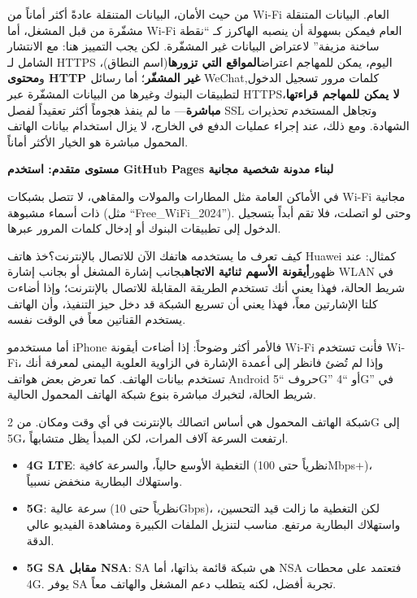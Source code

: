 
من حيث الأمان، البيانات المتنقلة عادةً أكثر أماناً من Wi-Fi العام. البيانات المتنقلة مشفّرة من قبل المشغل، أما Wi-Fi العام فيمكن بسهولة أن ينصبه الهاكرز كـ “نقطة ساخنة مزيفة” لاعتراض البيانات غير المشفّرة. لكن يجب التمييز هنا: مع الانتشار الشامل لـ HTTPS اليوم، يمكن للمهاجم اعتراض\textbf{المواقع التي تزورها}(اسم النطاق)، و\textbf{محتوى HTTP غير المشفّر}؛ أما رسائل WeChat,كلمات مرور تسجيل الدخول لتطبيقات البنوك وغيرها من البيانات المشفّرة عبر HTTPS،\textbf{لا يمكن للمهاجم قراءتها مباشرة}— ما لم ينفذ هجوماً أكثر تعقيداً لفصل SSL وتجاهل المستخدم تحذيرات الشهادة. ومع ذلك، عند إجراء عمليات الدفع في الخارج، لا يزال استخدام بيانات الهاتف المحمول مباشرة هو الخيار الأكثر أماناً.

\textbf{مستوى متقدم: استخدم GitHub Pages لبناء مدونة شخصية مجانية}\par

في الأماكن العامة مثل المطارات والمولات والمقاهي، لا تتصل بشبكات Wi-Fi مجانية ذات أسماء مشبوهة (مثل “Free\_WiFi\_2024”). وحتى لو اتصلت، فلا تقم أبداً بتسجيل الدخول إلى تطبيقات البنوك أو إدخال كلمات المرور عبرها.


كيف تعرف ما يستخدمه هاتفك الآن للاتصال بالإنترنت؟خذ هاتف Huawei كمثال: عند ظهور\textbf{أيقونة الأسهم ثنائية الاتجاه}بجانب إشارة المشغل أو بجانب إشارة WLAN في شريط الحالة، فهذا يعني أنك تستخدم الطريقة المقابلة للاتصال بالإنترنت؛ وإذا أضاءت كلتا الإشارتين معاً، فهذا يعني أن تسريع الشبكة قد دخل حيز التنفيذ، وأن الهاتف يستخدم القناتين معاً في الوقت نفسه.

أما مستخدمو iPhone فالأمر أكثر وضوحاً: إذا أضاءت أيقونة Wi-Fi فأنت تستخدم Wi-Fi، وإذا لم تُضئ فانظر إلى أعمدة الإشارة في الزاوية العلوية اليمنى لمعرفة أنك تستخدم بيانات الهاتف. كما تعرض بعض هواتف Android حروف “5G” أو “4G” في شريط الحالة، لتخبرك مباشرة بنوع شبكة الهاتف المحمول الحالية.


شبكة الهاتف المحمول هي أساس اتصالك بالإنترنت في أي وقت ومكان. من 2G إلى 5G، ارتفعت السرعة آلاف المرات، لكن المبدأ يظل متشابهاً.


\begin{itemize}
  \item \textbf{4G LTE}: التغطية الأوسع حالياً، والسرعة كافية (نظرياً حتى 100Mbps+)، واستهلاك البطارية منخفض نسبياً.
  \item \textbf{5G}: سرعة عالية (نظرياً حتى 10Gbps)، لكن التغطية ما زالت قيد التحسين، واستهلاك البطارية مرتفع. مناسب لتنزيل الملفات الكبيرة ومشاهدة الفيديو عالي الدقة.
  \item \textbf{5G SA مقابل NSA}: SA هي شبكة قائمة بذاتها، أما NSA فتعتمد على محطات 4G. يوفر SA تجربة أفضل، لكنه يتطلب دعم المشغل والهاتف معاً.
\end{itemize}

